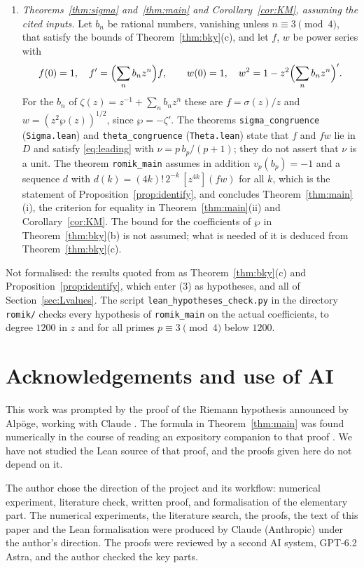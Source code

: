 \documentclass[11pt]{amsart}
\theoremstyle{definition}
\theoremstyle{remark}
\begin{document}
\begin{enumerate}
\item[(3)] \emph{Theorems~\ref{thm:sigma} and~\ref{thm:main} and Corollary~\ref{cor:KM}, assuming
the cited inputs.} Let $b_n$ be rational numbers, vanishing unless $n\equiv3\pmod4$, that satisfy
the bounds of Theorem~\ref{thm:bky}(c), and let $f$, $w$ be power series with
\[
f(0)=1,\quad f'=\Bigl(\sum_nb_nz^n\Bigr)f,\qquad w(0)=1,\quad
w^2=1-z^2\Bigl(\sum_nb_nz^n\Bigr)' .
\]
For the $b_n$ of $\zeta(z)=z^{-1}+\sum_nb_nz^n$ these are $f=\sigma(z)/z$ and
$w=(z^2\wp(z))^{1/2}$, since $\wp=-\zeta'$. The theorems \texttt{sigma\_congruence}
(\texttt{Sigma.lean}) and \texttt{theta\_congruence} (\texttt{Theta.lean}) state that $f$ and $fw$
lie in $D$ and satisfy \eqref{eq:leading} with $\nu=p\,b_p/(p+1)$; they do not assert that $\nu$
is a unit. The theorem
\texttt{romik\_main} assumes in addition $v_p(b_p)=-1$ and a sequence $d$ with
$d(k)=(4k)!\,2^{-k}\,[z^{4k}](fw)$ for all $k$, which is the statement of
Proposition~\ref{prop:identify}, and concludes Theorem~\ref{thm:main}(i), the criterion for
equality in Theorem~\ref{thm:main}(ii) and Corollary~\ref{cor:KM}. The bound for the coefficients
of $\wp$ in Theorem~\ref{thm:bky}(b) is not assumed; what is needed of it is deduced from
Theorem~\ref{thm:bky}(c).
\end{enumerate}

Not formalised: the results quoted from \cite{BKY} as Theorem~\ref{thm:bky}(c) and
Proposition~\ref{prop:identify}, which enter (3) as hypotheses, and all of
Section~\ref{sec:Lvalues}. The script
\texttt{lean\_hypotheses\_check.py} in the directory \texttt{romik/} checks every hypothesis of
\texttt{romik\_main} on the actual coefficients, to degree $1200$ in $z$ and for all primes
$p\equiv3\pmod4$ below $1200$.

\section*{Acknowledgements and use of AI}

This work was prompted by the proof of the Riemann hypothesis announced by Alp\"oge, working
with Claude \cite{Alpoge}. The formula in Theorem~\ref{thm:main} was found numerically in the
course of reading an expository companion to that proof \cite{Companion}. We have not
studied the Lean source of that proof, and the proofs given here do not depend on it.

The author chose the direction of the project and its workflow: numerical experiment, literature
check, written proof, and formalisation of the elementary part. The numerical experiments, the
literature search, the proofs, the text of this paper and the Lean formalisation were produced by
Claude (Anthropic) under the author's direction. The proofs were reviewed by a second AI system,
GPT-6.2 Astra, and the author checked the key parts.
\end{document}
